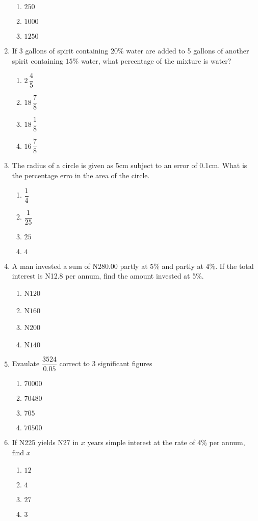 \begin{multicols}{2}
\begin{enumerate}[label={\arabic*.}]
\begin{enumerate}[label={\Alph*.}]
    \item \(250\)
    \item \(1000\)
    \item \(1250\)
    \end{enumerate}
\item If 3 gallons of spirit containing $20\%$ water are added to 5 gallons of another spirit containing $15\%$ water, what percentage of the mixture is water?
    \begin{enumerate}[label={\Alph*.}]
    \item \(2\,\dfrac{4}{5}\)
    \item \(18\,\dfrac{7}{8}\)
    \item \(18\,\dfrac{1}{8}\)
    \item \(16\,\dfrac{7}{8}\)

    \end{enumerate}
\item The radius of a circle is given as 5cm subject to an error of 0.1cm. What is the percentage erro in the area of the circle.
    \begin{enumerate}[label={\Alph*.}]
    \item \(\dfrac{1}{4}\)
    \item \(\dfrac{1}{25}\)
    \item \(25\)
    \item \(4\)

    \end{enumerate}
\item A man invested a sum of N280.00 partly at 5\% and partly at 4\%. If the total interest is N12.8 per annum, find the amount invested at 5\%.
    \begin{enumerate}[label={\Alph*.}]
    \item N\(120\)
    \item N\(160\)
    \item N\(200\)
    \item N\(140\)

    \end{enumerate}
\item Evaulate $\dfrac{3524}{0.05}$ correct to 3 significant figures
    \begin{enumerate}[label={\Alph*.}]
    \item \(70000\)
    \item \(70480\)
    \item \(705\)
    \item \(70500\)

    \end{enumerate}
\item If N225 yields N27 in $x$ years simple interest at the rate of 4\% per annum, find $x$
    \begin{enumerate}[label={\Alph*.}]
    \item \(12\)
    \item \(4\)
    \item \(27\)
    \item \(3\)


\end{enumerate}
\end{enumerate}
\end{multicols}
